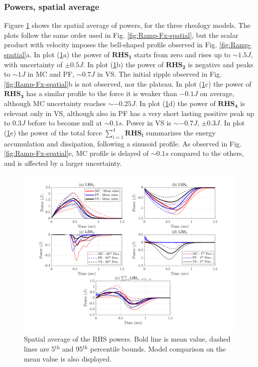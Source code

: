 \documentclass{article}
\begin{document}
\subsubsection{Powers, spatial average}
Figure \ref{fig:Ramp-Power-spatial} shows the spatial average of powers, for the three rheology models. The plots follow the same order used in Fig. \ref{fig:Ramp-Fx-spatial}, but the scalar product with velocity imposes the bell-shaped profile observed in Fig. \ref{fig:Ramp-spatial}a. In plot (\ref{fig:Ramp-Power-spatial}a) the power of $\boldsymbol{RHS_1}$ starts from zero and rises up to $\sim 1.5 J$, with uncertainty of $\pm 0.5 J$.  In plot (\ref{fig:Ramp-Power-spatial}b) the power of  $\boldsymbol{RHS_2}$ is negative and peaks to $\sim 1 J$ in MC and PF, $\sim 0.7 J$ in VS. The initial ripple observed in Fig. \ref{fig:Ramp-Fx-spatial}b is not observed, nor the plateau. In plot (\ref{fig:Ramp-Power-spatial}c) the power of $\boldsymbol{RHS_3}$ has a similar profile to the force it is weaker than $-0.1 J$ on average, although MC uncertainty reaches $\sim -0.25 J$. In plot (\ref{fig:Ramp-Power-spatial}d) the power of $\boldsymbol{RHS_4}$ is relevant only in VS, although also in PF has a very short lasting positive peak up to $0.3 J$ before to become null at $\sim 0.1 s$. Power in VS is  $\sim -0.7 J$, $\pm 0.3 J$. In plot (\ref{fig:Ramp-Power-spatial}e) the power of the total force $\sum^4_{i=1}\boldsymbol{RHS_i}$ summarizes the energy accumulation and dissipation, following a sinusoid profile. As observed in Fig. \ref{fig:Ramp-Fx-spatial}e, MC profile is delayed of $\sim 0.1 s$ compared to the others, and is affected by a larger uncertainty.
\begin{figure}[H]
        \centering
        \includegraphics[width=1\textwidth]{InclinedPlane/AveragedMeasurments/PowersIncline.png}
        \caption{Spatial average of the RHS powers. Bold line is mean value, dashed lines are 5$^{\mathrm{th}}$ and 95$^{\mathrm{th}}$ percentile bounds. Model comparison on the mean value is also displayed.}
        \label{fig:Ramp-Power-spatial}
\end{figure}
\end{document}
